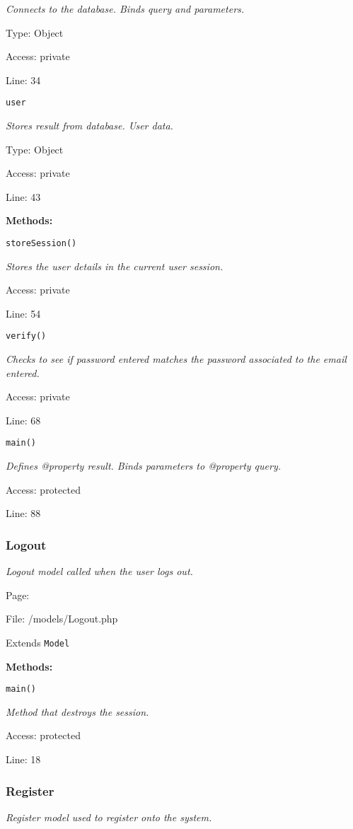 {\scriptsize
\textit{Connects to the database.
Binds query and parameters.}

Type: Object

Access: private

Line: 34

}
\texttt{user}

{\scriptsize
\textit{Stores result from database.
User data.}

Type: Object

Access: private

Line: 43

}
\textbf{Methods:}

\texttt{storeSession()}

{\scriptsize
\textit{Stores the user details in the current user session.}

Access: private

Line: 54

}

\texttt{verify()}

{\scriptsize
\textit{Checks to see if password entered matches the password associated to the email entered.}

Access: private

Line: 68

}

\texttt{main()}

{\scriptsize
\textit{Defines @property result.
Binds parameters to @property query.}

Access: protected

Line: 88

}

\subsubsection{Logout}\label{Logout.php.doc}
\textit{Logout model called when the user logs out.}

Page: \pageref{Logout.php}

File: /models/Logout.php

Extends \texttt{Model}

\textbf{Methods:}

\texttt{main()}

{\scriptsize
\textit{Method that destroys the session.}

Access: protected

Line: 18

}

\subsubsection{Register}\label{Register.php.doc}
\textit{Register model used to register onto the system.}

